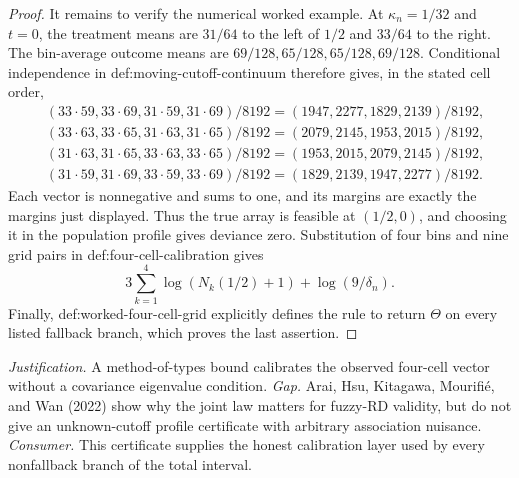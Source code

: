 \documentclass{article}
\begin{document}
\begin{proof}
It remains to verify the numerical worked example.  At \(\kappa_n=1/32\) and \(t=0\), the treatment means are \(31/64\) to the left of \(1/2\) and \(33/64\) to the right.  The bin-average outcome means are \(69/128,65/128,65/128,69/128\).  Conditional independence in def:moving-cutoff-continuum therefore gives, in the stated cell order,
\[
\begin{aligned}
 &(33\cdot59,33\cdot69,31\cdot59,31\cdot69)/8192
   =(1947,2277,1829,2139)/8192,\\
 &(33\cdot63,33\cdot65,31\cdot63,31\cdot65)/8192
   =(2079,2145,1953,2015)/8192,\\
 &(31\cdot63,31\cdot65,33\cdot63,33\cdot65)/8192
   =(1953,2015,2079,2145)/8192,\\
 &(31\cdot59,31\cdot69,33\cdot59,33\cdot69)/8192
   =(1829,2139,1947,2277)/8192.
\end{aligned}
\]
Each vector is nonnegative and sums to one, and its margins are exactly the margins just displayed.  Thus the true array is feasible at \((1/2,0)\), and choosing it in the population profile gives deviance zero.  Substitution of four bins and nine grid pairs in def:four-cell-calibration gives
\[
 3\sum_{k=1}^4\log(N_k(1/2)+1)+\log(9/\delta_n).
\]
Finally, def:worked-four-cell-grid explicitly defines the rule to return \(\Theta\) on every listed fallback branch, which proves the last assertion.
\end{proof}
\par\smallskip\noindent \textit{Justification.} A method-of-types bound calibrates the observed four-cell vector without a covariance eigenvalue condition. \textit{Gap.} Arai, Hsu, Kitagawa, Mourifi{\'e}, and Wan (2022) show why the joint law matters for fuzzy-RD validity, but do not give an unknown-cutoff profile certificate with arbitrary association nuisance. \textit{Consumer.} This certificate supplies the honest calibration layer used by every nonfallback branch of the total interval.
\end{document}
